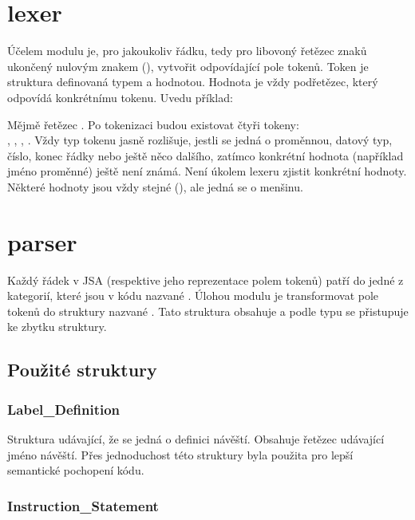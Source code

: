 \documentclass[czech, kiv, he, sem, pdf, viewonly]{fasthesis}
\begin{document}
\section{lexer}

Účelem modulu  je, pro jakoukoliv řádku, tedy pro libovoný
řetězec znaků ukončený nulovým znakem (\command{\0}), vytvořit odpovídající pole
tokenů. Token je struktura definovaná typem a hodnotou. Hodnota je vždy
podřetězec, který odpovídá konkrétnímu tokenu. Uvedu příklad:

Mějmě řetězec . Po tokenizaci budou existovat čtyři
tokeny: \\, ,
, . Vždy typ tokenu jasně rozlišuje,
jestli se jedná o proměnnou, datový typ, číslo, konec řádky nebo ještě něco
dalšího, zatímco konkrétní hodnota (například jméno proměnné) ještě není známá.
Není úkolem lexeru zjistit konkrétní hodnoty. Některé hodnoty jsou vždy stejné
(), ale jedná se o menšinu.

\section{parser}

Každý řádek v JSA (respektive jeho reprezentace polem tokenů) patří do jedné z
kategorií, které jsou v kódu nazvané . Úlohou
modulu  je transformovat pole tokenů do struktury nazvané
. Tato struktura obsahuje  a
podle typu se přistupuje ke zbytku struktury.



\subsection{Použité struktury}

\subsubsection{Label\_Definition}

Struktura udávající, že se jedná o definici návěští. Obsahuje řetězec udávající
jméno návěští. Přes jednoduchost této struktury byla použita pro lepší
semantické pochopení kódu.

\subsubsection{Instruction\_Statement}
\end{document}
